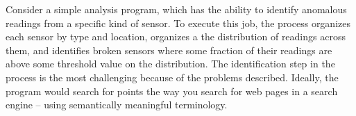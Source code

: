 




Consider a simple analysis program, which has the ability
to identify anomalous readings from a specific kind of sensor. To execute this job, 
the process organizes each sensor by type and location, organizes a the distribution of
readings across them, and identifies broken sensors where some fraction of
their readings are above some threshold value on the distribution.
The identification step in the process is the most challenging 
because of the problems described.  Ideally, the program would search for points the
way you search for web pages in a search engine -- using semantically meaningful 
terminology. 

